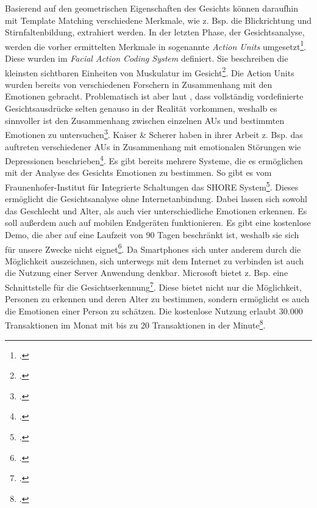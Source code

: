 Basierend auf den geometrischen Eigenschaften des Gesichts können daraufhin mit Template Matching verschiedene Merkmale, wie z. Bsp. die Blickrichtung und Stirnfaltenbildung, extrahiert werden. In der letzten Phase, der Gesichtsanalyse, werden die vorher ermittelten Merkmale in sogenannte \textit{Action Units} umgesetzt\footcite[Vgl. ][S.4 Z.17-21]{Can01}. Diese wurden im \textit{Facial Action Coding System} definiert. Sie beschreiben die kleinsten sichtbaren Einheiten von Muskulatur im Gesicht\footcite[Vgl. ][S.94 Z.9ff]{Kai98}. Die Action Units wurden bereits von verschiedenen Forschern in Zusammenhang mit den Emotionen gebracht. Problematisch ist aber laut \cite{Kai98}, dass vollständig vordefinierte Gesichtsausdrücke selten genauso in der Realität vorkommen, weshalb es sinnvoller ist den Zusammenhang zwischen einzelnen AUs und bestimmten Emotionen zu untersuchen\footcite[Vgl. ][S.94 Z.16-30]{Kai98}. Kaiser \& Scherer haben in ihrer Arbeit z. Bsp. das auftreten verschiedener AUs in Zusammenhang mit emotionalen Störungen wie Depressionen beschrieben\footcite[Vgl. ][S.95 Table 6.3 Facial Action Units Predicted as Indicators of Selected Types of Affect Disorders]{Kai98}.
Es gibt bereits mehrere Systeme, die es ermöglichen mit der Analyse des Gesichts Emotionen zu bestimmen. So gibt es vom Fraunenhofer-Institut für Integrierte Schaltungen das SHORE System\footcite[Vgl. ][]{Fra18}. Dieses ermöglicht die Gesichtsanalyse ohne Internetanbindung. Dabei lassen sich sowohl das Geschlecht und Alter, als auch vier unterschiedliche Emotionen erkennen. Es soll außerdem auch auf mobilen Endgeräten funktionieren. Es gibt eine kostenlose Demo, die aber auf eine Laufzeit von 90 Tagen beschränkt ist, weshalb sie sich für unsere Zwecke nicht eignet\footcite[Vgl. ][]{Fra18b}.\newline
Da Smartphones sich unter anderem durch die Möglichkeit auszeichnen, sich unterwegs mit dem Internet zu verbinden ist auch die Nutzung einer Server Anwendung denkbar. Microsoft bietet z. Bsp. eine Schnittstelle für die Gesichtserkennung\footcite[Vgl. ][]{Mic18}. Diese bietet nicht nur die Möglichkeit, Personen zu erkennen und deren Alter zu bestimmen, sondern ermöglicht es auch die Emotionen einer Person zu schätzen. Die kostenlose Nutzung erlaubt 30.000 Transaktionen im Monat mit bis zu 20 Transaktionen in der Minute\footcite[Vgl. ][]{Mic18b}.
